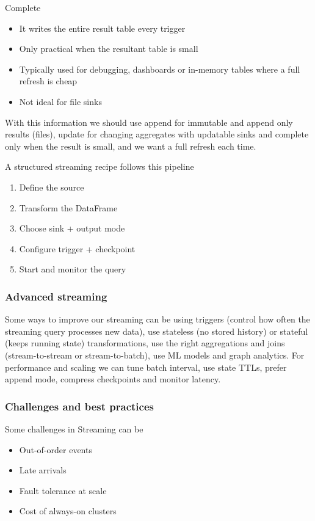 Complete
\begin{itemize}
    \item It writes the entire result table every trigger
    \item Only practical when the resultant table is small
    \item Typically used for debugging, dashboards or in-memory tables where a full refresh is cheap
    \item Not ideal for file sinks
\end{itemize}

With this information we should use append for immutable and append only results (files), update for changing aggregates with updatable sinks and complete only when the result is small, and we want a full refresh each time. 

\vspace{10pt}

A structured streaming recipe follows this pipeline

\begin{enumerate}
    \item Define the source
    \item Transform the DataFrame
    \item Choose sink + output mode
    \item Configure trigger + checkpoint
    \item Start and monitor the query
\end{enumerate}




\subsubsection{Advanced streaming}

Some ways to improve our streaming can be using triggers (control how often the streaming query processes new data), use stateless (no stored history) or stateful (keeps running state) transformations, use the right aggregations and joins (stream-to-stream or stream-to-batch), use ML models and graph analytics. For performance and scaling we can tune batch interval, use state TTLs, prefer append mode, compress checkpoints and monitor latency. 


\subsubsection{Challenges and best practices}

Some challenges in Streaming can be
\begin{itemize}
    \item Out-of-order events
    \item Late arrivals
    \item Fault tolerance at scale
    \item Cost of always-on clusters
\end{itemize}

